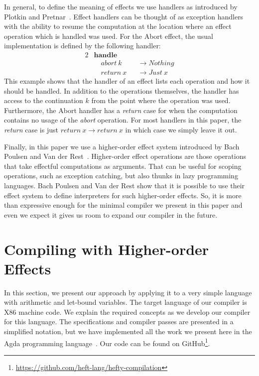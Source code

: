 \documentclass[a4paper,UKenglish,cleveref, autoref, thm-restate, anonymous]{oasics-v2021}
\begin{document}
In general, to define the meaning of effects we use handlers as introduced by Plotkin and Pretnar~\cite{10.1007/978-3-642-00590-9_7}.
Effect handlers can be thought of as exception handlers with the ability to resume the computation at the location where an effect operation which is handled was used.
For the Abort effect, the usual implementation is defined by the following handler:
\begin{alignat*}{2}
  & \mathbf{handle} && \\
  & \quad\mathit{abort}~k && \to \mathit{Nothing} \\
  & \quad\mathit{return}~x && \to \mathit{Just}~x
\end{alignat*}
This example shows that the handler of an effect lists each operation and how it should be handled.
In addition to the operations themselves, the handler has access to the continuation $k$ from the point where the operation was used.
Furthermore, the Abort handler has a \textit{return} case for when the computation contains no usage of the \textit{abort} operation.
For most handlers in this paper, the \textit{return} case is just $\textit{return}~x \to \textit{return}~x$ in which case we simply leave it out.

Finally, in this paper we use a higher-order effect system introduced by Bach Poulsen and Van der Rest~\cite{10.1145/3571255}.
Higher-order effect operations are those operations that take effectful computations as arguments.
That can be useful for scoping operations, such as exception catching, but also thunks in lazy programming languages.
Bach Poulsen and Van der Rest show that it is possible to use their effect system to define interpreters for such higher-order effects.
So, it is more than expressive enough for the minimal compiler we present in this paper and even we expect it gives us room to expand our compiler in the future.

\section{Compiling with Higher-order Effects}\label{sec:compiling}

In this section, we present our approach by applying it to a very simple language with arithmetic and let-bound variables.
The target language of our compiler is X86 machine code.
We explain the required concepts as we develop our compiler for this language.
The specifications and compiler passes are presented in a simplified notation, but we have implemented all the work we present here in the Agda programming language~\cite{10.1007/978-3-642-03359-9_6}.
Our code can be found on GitHub\footnote{\url{https://github.com/heft-lang/hefty-compilation}}.
\end{document}

